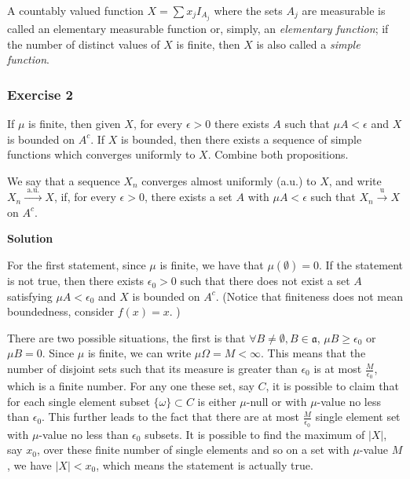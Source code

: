 \documentclass[
]{article}
\begin{document}
A countably valued function \(X=\sum x_j I_{A_j}\) where the sets
\(A_j\) are measurable is called an elementary measurable function or,
simply, an \emph{elementary function}; if the number of distinct values
of \(X\) is finite, then \(X\) is also called a \emph{simple function}.

\hypertarget{exercise-2-2}{%
  \subsubsection{\texorpdfstring{Exercise 2
    }{Exercise 2 }}\label{exercise-2-2}}

If \(\mu\) is finite, then given \(X\), for every \(\epsilon > 0\) there
exists \(A\) such that \(\mu A<\epsilon\) and \(X\) is bounded on
\(A^{c}.\) If \(X\) is bounded, then there exists a sequence of simple
functions which converges uniformly to \(X.\) Combine both propositions.

We say that a sequence \(X_n\) converges almost uniformly (a.u.) to
\(X\), and write \(X_n \stackrel{\text { a.u. }}{\longrightarrow} X\),
if, for every \(\epsilon>0\), there exists a set \(A\) with
\(\mu A<\epsilon\) such that
\(X_n \stackrel{\mathrm{u}}{\longrightarrow} X\) on \(A^c\).

\textbf{Solution}

For the first statement, since \(\mu\) is finite, we have that
\(\mu(\emptyset) = 0\). If the statement is not true, then there exists
\(\epsilon_0 > 0\) such that there does not exist a set \(A\) satisfying
\(\mu A < \epsilon_0\) and \(X\) is bounded on \(A^c\). (Notice that
finiteness does not mean boundedness, consider \(f(x) = x\). )

There are two possible situations, the first is that
\(\forall B \ne \emptyset, B \in \mathfrak a\), \(\mu B \ge \epsilon_0\)
or \(\mu B = 0\). Since \(\mu\) is finite, we can write
\(\mu \Omega = M < \infty\). This means that the number of disjoint sets
such that its measure is greater than \(\epsilon_0\) is at most
\(\frac{M}{\epsilon_0}\), which is a finite number. For any one these
set, say \(C\), it is possible to claim that for each single element
subset \(\{\omega\} \subset C\) is either \(\mu\)-null or with
\(\mu\)-value no less than \(\epsilon_0\). This further leads to the
fact that there are at most \(\frac{M}{\epsilon_0}\) single element set
with \(\mu\)-value no less than \(\epsilon_0\) subsets. It is possible
to find the maximum of \(|X|\), say \(x_0\), over these finite number of
single elements and so on a set with \(\mu\)-value \(M\), we have
\(|X| < x_0\), which means the statement is actually true.
\end{document}
